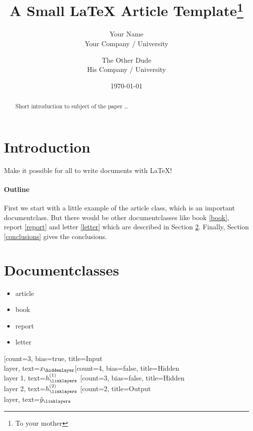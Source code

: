 \documentclass{article}
\title{A Small \LaTeX{} Article Template\thanks{To your mother}}
\author{Your Name  \\
	Your Company / University  \\
	\and 
	The Other Dude \\
	His Company / University \\
}
\date{\today}
\begin{document}
			
			\maketitle
			
			
			\begin{abstract}
				Short introduction to subject of the paper \ldots 
			\end{abstract}
			
			\section{Introduction}
			Make it possible for all to write documents with \LaTeX{}!
			
			\paragraph{Outline}
			First we start with a little example of the article class, which is an 
			important documentclass. But there would be other documentclasses like 
			book \ref{book}, report \ref{report} and letter \ref{letter} which are 
			described in Section \ref{documentclasses}. Finally, Section 
			\ref{conclusions} gives the conclusions.
			
			
			
			\section{Documentclasses} \label{documentclasses}
			
			\begin{itemize}
				\item article
				\item book 
				\item report 
				\item letter 
			\end{itemize}
		
			\begin{neuralnetwork}[height=4]
				\newcommand{\x}[2]{$x_#2$}
				\newcommand{\y}[2]{$\hat{y}_#2$}
				\newcommand{\hfirst}[2]{\small $h^{(1)}_#2$}
				\newcommand{\hsecond}[2]{\small $h^{(2)}_#2$}
				[count=3, bias=true, title=Input\\layer, text=\x]
				\hiddenlayer[count=4, bias=false, title=Hidden\\layer 1, text=\hfirst] \linklayers
				\hiddenlayer[count=3, bias=false, title=Hidden\\layer 2, text=\hsecond] \linklayers
				\outputlayer[count=2, title=Output\\layer, text=\y] \linklayers
			\end{neuralnetwork}
			
\end{document}

